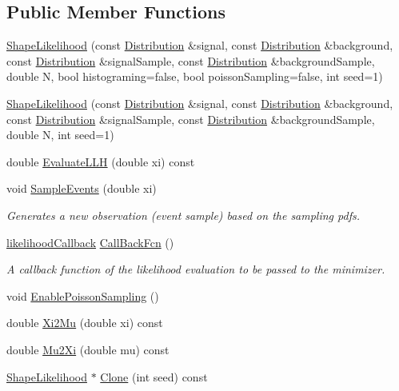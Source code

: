 \subsection*{Public Member Functions}
\begin{DoxyCompactItemize}
\item 
\hyperlink{classShapeLikelihood_aa55ad8f50f5965c942efcdf6bff59713}{Shape\-Likelihood} (const \hyperlink{classDistribution}{Distribution} \&signal, const \hyperlink{classDistribution}{Distribution} \&background, const \hyperlink{classDistribution}{Distribution} \&signal\-Sample, const \hyperlink{classDistribution}{Distribution} \&background\-Sample, double N, bool histograming=false, bool poisson\-Sampling=false, int seed=1)
\item 
\hyperlink{classShapeLikelihood_a138035dc74b7e1cb135e93afaf9e56d7}{Shape\-Likelihood} (const \hyperlink{classDistribution}{Distribution} \&signal, const \hyperlink{classDistribution}{Distribution} \&background, const \hyperlink{classDistribution}{Distribution} \&signal\-Sample, const \hyperlink{classDistribution}{Distribution} \&background\-Sample, double N, int seed=1)
\item 
double \hyperlink{classShapeLikelihood_afe024bedaab4633ded018d23d17c37f8}{Evaluate\-L\-L\-H} (double xi) const 
\item 
void \hyperlink{classShapeLikelihood_aa303861500c399cb680d89b15d08b806}{Sample\-Events} (double xi)
\begin{DoxyCompactList}\small\item\em Generates a new observation (event sample) based on the sampling pdfs. \end{DoxyCompactList}\item 
\hyperlink{Likelihood_8h_a97d92c5c141f28319e7e8198defc9084}{likelihood\-Callback} \hyperlink{classShapeLikelihood_acf56e312fd4f0881aa09215d73b93412}{Call\-Back\-Fcn} ()
\begin{DoxyCompactList}\small\item\em A callback function of the likelihood evaluation to be passed to the minimizer. \end{DoxyCompactList}\item 
void \hyperlink{classShapeLikelihood_aad505df9d12960a6ed614f8c56b87b16}{Enable\-Poisson\-Sampling} ()
\item 
double \hyperlink{classShapeLikelihood_a03f18beacb939bb6766c93e1a9d202b4}{Xi2\-Mu} (double xi) const 
\item 
double \hyperlink{classShapeLikelihood_a37d2b69c8d222ffccd0a649f91272043}{Mu2\-Xi} (double mu) const 
\item 
\hyperlink{classShapeLikelihood}{Shape\-Likelihood} $\ast$ \hyperlink{classShapeLikelihood_a67630eb790d07ef1d0d2e33711495cbe}{Clone} (int seed) const 
\end{DoxyCompactItemize}
